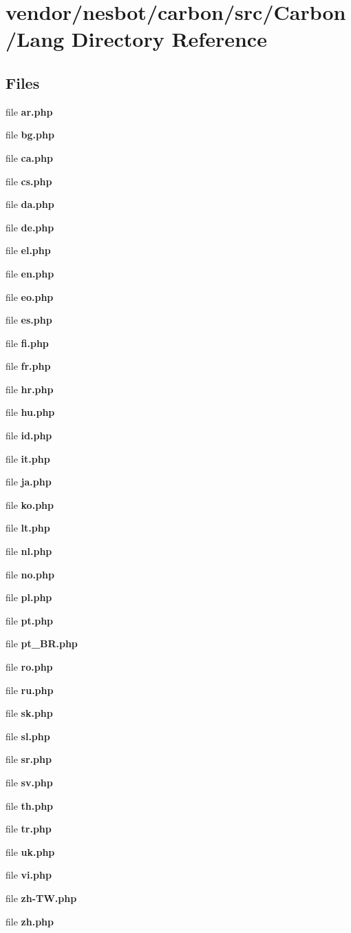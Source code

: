 \section{vendor/nesbot/carbon/src/\+Carbon/\+Lang Directory Reference}
\label{dir_2a36c2b6b89c678015b35fe6cfd4638b}
\subsection*{Files}
\begin{DoxyCompactItemize}
\item 
file {\bf ar.\+php}
\item 
file {\bf bg.\+php}
\item 
file {\bf ca.\+php}
\item 
file {\bf cs.\+php}
\item 
file {\bf da.\+php}
\item 
file {\bf de.\+php}
\item 
file {\bf el.\+php}
\item 
file {\bf en.\+php}
\item 
file {\bf eo.\+php}
\item 
file {\bf es.\+php}
\item 
file {\bf fi.\+php}
\item 
file {\bf fr.\+php}
\item 
file {\bf hr.\+php}
\item 
file {\bf hu.\+php}
\item 
file {\bf id.\+php}
\item 
file {\bf it.\+php}
\item 
file {\bf ja.\+php}
\item 
file {\bf ko.\+php}
\item 
file {\bf lt.\+php}
\item 
file {\bf nl.\+php}
\item 
file {\bf no.\+php}
\item 
file {\bf pl.\+php}
\item 
file {\bf pt.\+php}
\item 
file {\bf pt\+\_\+\+B\+R.\+php}
\item 
file {\bf ro.\+php}
\item 
file {\bf ru.\+php}
\item 
file {\bf sk.\+php}
\item 
file {\bf sl.\+php}
\item 
file {\bf sr.\+php}
\item 
file {\bf sv.\+php}
\item 
file {\bf th.\+php}
\item 
file {\bf tr.\+php}
\item 
file {\bf uk.\+php}
\item 
file {\bf vi.\+php}
\item 
file {\bf zh-\/\+T\+W.\+php}
\item 
file {\bf zh.\+php}
\end{DoxyCompactItemize}
